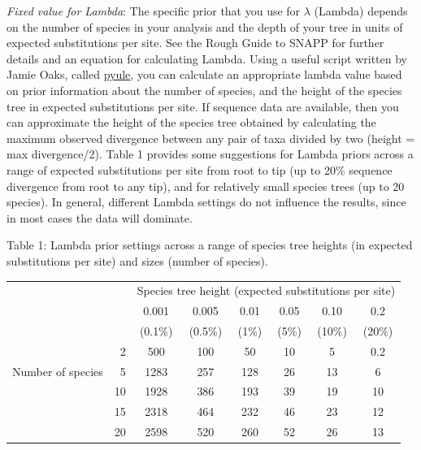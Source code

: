 {    
\textit{Fixed value for Lambda}: The specific prior that you use for {$\lambda$} (Lambda) depends on the number of species in your analysis and the depth of your tree in units of expected substitutions per site. See the Rough Guide to SNAPP for further details and an equation for calculating Lambda. Using a useful script written by Jamie Oaks, called \href{https://github.com/joaks1/pyule}{pyule}, you can calculate an appropriate lambda value based on prior information about the number of species, and the height of the species tree in expected substitutions per site. If sequence data are available, then you can approximate the height of the species tree obtained by calculating the maximum observed divergence between any pair of taxa divided by two (height = max divergence/2). 
   \newpage
Table 1 provides some suggestions for Lambda priors across a range of expected substitutions per site from root to tip (up to 20\% sequence divergence from root to any tip), and for relatively small species trees (up to 20 species). In general, different Lambda settings do not influence the results, since in most cases the data will dominate. 

Table 1: Lambda prior settings across a range of species tree heights (in expected substitutions per site) and sizes (number of species).
\begin{table}[ht]
\tabcolsep=0.4cm
\begin{tabular}{rrcccccc}
\hline
        &    & \multicolumn{6}{c}{Species tree height (expected substitutions per site)}     \\
        				&    	& 0.001 	& 0.005 	& 0.01 	& 0.05  	& 0.10 	&0.2\\
        				&    	&  (0.1\%)	&  (0.5\%) &  (1\%) 	&  (5\%)  	& (10\%)  	& (20\%)\\ \hline
        				& 2 	& 500	& 100 	& 50 		& 10 		& 5 		& 0.2\\
Number of species 	& 5	& 1283 	& 257 	& 128 	& 26 		& 13 		& 6\\
        				& 10	& 1928 	& 386 	& 193 	& 39 		& 19 		& 10\\
        				& 15	&  2318	&  464	&  232	& 46		& 23		& 12\\
        				& 20	&  2598	&  520	&  260	& 52 		& 26 		& 13\\\hline
\end{tabular}
\end{table}
    
}
